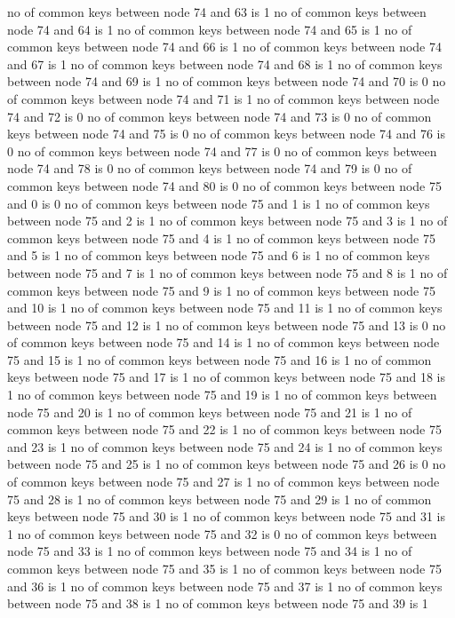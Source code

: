 no of common keys between node 74 and 63 is 1
no of common keys between node 74 and 64 is 1
no of common keys between node 74 and 65 is 1
no of common keys between node 74 and 66 is 1
no of common keys between node 74 and 67 is 1
no of common keys between node 74 and 68 is 1
no of common keys between node 74 and 69 is 1
no of common keys between node 74 and 70 is 0
no of common keys between node 74 and 71 is 1
no of common keys between node 74 and 72 is 0
no of common keys between node 74 and 73 is 0
no of common keys between node 74 and 75 is 0
no of common keys between node 74 and 76 is 0
no of common keys between node 74 and 77 is 0
no of common keys between node 74 and 78 is 0
no of common keys between node 74 and 79 is 0
no of common keys between node 74 and 80 is 0
no of common keys between node 75 and 0 is 0
no of common keys between node 75 and 1 is 1
no of common keys between node 75 and 2 is 1
no of common keys between node 75 and 3 is 1
no of common keys between node 75 and 4 is 1
no of common keys between node 75 and 5 is 1
no of common keys between node 75 and 6 is 1
no of common keys between node 75 and 7 is 1
no of common keys between node 75 and 8 is 1
no of common keys between node 75 and 9 is 1
no of common keys between node 75 and 10 is 1
no of common keys between node 75 and 11 is 1
no of common keys between node 75 and 12 is 1
no of common keys between node 75 and 13 is 0
no of common keys between node 75 and 14 is 1
no of common keys between node 75 and 15 is 1
no of common keys between node 75 and 16 is 1
no of common keys between node 75 and 17 is 1
no of common keys between node 75 and 18 is 1
no of common keys between node 75 and 19 is 1
no of common keys between node 75 and 20 is 1
no of common keys between node 75 and 21 is 1
no of common keys between node 75 and 22 is 1
no of common keys between node 75 and 23 is 1
no of common keys between node 75 and 24 is 1
no of common keys between node 75 and 25 is 1
no of common keys between node 75 and 26 is 0
no of common keys between node 75 and 27 is 1
no of common keys between node 75 and 28 is 1
no of common keys between node 75 and 29 is 1
no of common keys between node 75 and 30 is 1
no of common keys between node 75 and 31 is 1
no of common keys between node 75 and 32 is 0
no of common keys between node 75 and 33 is 1
no of common keys between node 75 and 34 is 1
no of common keys between node 75 and 35 is 1
no of common keys between node 75 and 36 is 1
no of common keys between node 75 and 37 is 1
no of common keys between node 75 and 38 is 1
no of common keys between node 75 and 39 is 1
